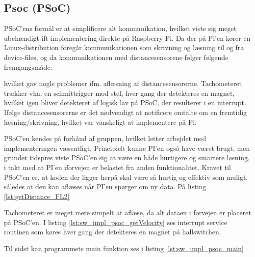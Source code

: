 \subsection{Psoc (PSoC)} \label{sub:sw_impl_psoc_psoc}

PSoC'ens formål er at simplificere alt \IIC kommunikation, hvilket viste sig meget ubehændigt ift implementering direkte på Raspberry Pi. Da der på Pi'en kører en Linux-distribution foregår \IIC kommunikationen som skrivning og læsning til og fra device-files, og da kommunikationen med distancesensorene følger følgende fremgangsmåde: 
 


hvilket gav nogle problemer ifm. aflæsning af distancesensorerne. Tachometeret trækker vha. en schmittrigger mod stel, hver gang der detekteres en magnet, hvilket igen bliver detekteret af logisk lav på PSoC, der resulterer i en interrupt. Ifølge distancesensorerne er det nødvendigt at notificere omtalte om en fremtidig læsning/skrivning, hvilket var vanskeligt at implementere på Pi. 

PSoC'en kendes på forhånd af gruppen, hvilket letter arbejdet med implementeringen væsentligt. Principielt kunne PI'en også have været brugt, men grundet tidspres viste PSoC'en sig at være en både hurtigere og smartere løsning, i takt med at PI'en iforvejen er belastet fra anden funktionalitet. Kravet til PSoC'en er, at koden der ligger herpå skal være så hurtig og effektiv som muligt, således at den kan aflæses når PI'en spørger om ny data. På listing \ref{lst:getDistance_FL2}




Tachometeret er meget mere simpelt at aflæse, da alt dataen i forvejen er placeret på PSoC'en. I listing \ref{lst:sw_impl_psoc_getVelocity} ses interrupt service routinen som køres hver gang der detekteres en magnet på hallswitchen.



Til sidst kan programmets main funktion ses i listing \ref{lst:sw_impl_psoc_main}



\clearpage
